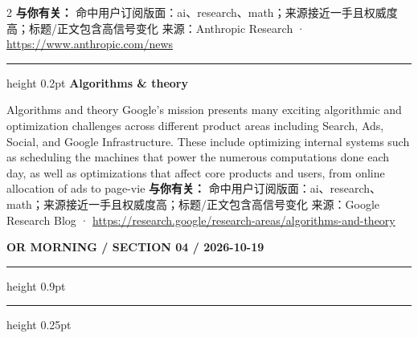 \documentclass[10.5pt]{ctexart}
\begin{document}
\begin{multicols}{2}
\textbf{与你有关：} 命中用户订阅版面：ai、research、math；来源接近一手且权威度高；标题/正文包含高信号变化
{\footnotesize\color{ormuted} 来源：Anthropic Research · \url{https://www.anthropic.com/news}}
\vspace{2mm}
\hrule height 0.2pt
\vspace{2mm}
{\large\bfseries Algorithms \& theory}\par
Algorithms and theory Google’s mission presents many exciting algorithmic and optimization challenges across different product areas including Search, Ads, Social, and Google Infrastructure. These include optimizing internal systems such as scheduling the machines that power the numerous computations done each day, as well as optimizations that affect core products and users, from online allocation of ads to page-vie
\textbf{与你有关：} 命中用户订阅版面：ai、research、math；来源接近一手且权威度高；标题/正文包含高信号变化
{\footnotesize\color{ormuted} 来源：Google Research Blog · \url{https://research.google/research-areas/algorithms-and-theory}}
\end{multicols}
\newpage
{\small\bfseries OR MORNING / SECTION 04 / 2026-10-19}
\vspace{2mm}
\hrule height 0.9pt
\vspace{1.5mm}
\hrule height 0.25pt
\vspace{4mm}
\end{document}
